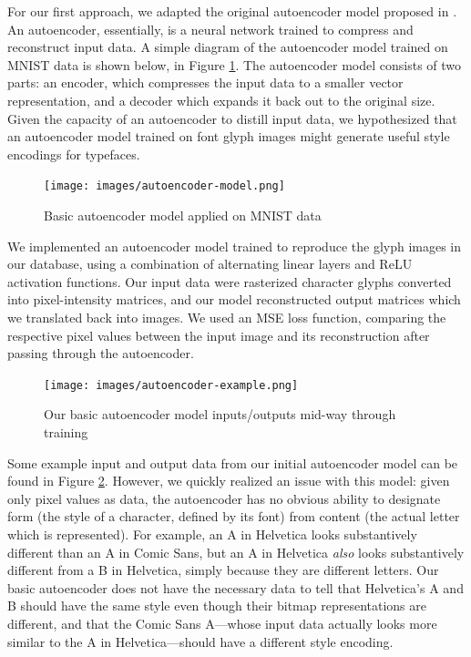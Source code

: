 For our first approach, we adapted the original autoencoder model proposed in \cite{rumelhart1986}. An autoencoder, essentially, is a neural network trained to compress and reconstruct input data. A simple diagram of the autoencoder model trained on MNIST data is shown below, in Figure \ref{fig:autoencoder-model}. The autoencoder model consists of two parts: an encoder, which compresses the input data to a smaller vector representation, and a decoder which expands it back out to the original size. Given the capacity of an autoencoder to distill input data, we hypothesized that an autoencoder model trained on font glyph images might generate useful style encodings for typefaces.

\begin{figure}[h]
    \centering
    \texttt{[image: images/autoencoder-model.png]}
    \caption{Basic autoencoder model applied on MNIST data}
    \label{fig:autoencoder-model}
\end{figure}

We implemented an autoencoder model trained to reproduce the glyph images in our database, using a combination of alternating linear layers and ReLU activation functions. Our input data were rasterized character glyphs converted into pixel-intensity matrices, and our model reconstructed output matrices which we translated back into images. We used an MSE loss function, comparing the respective pixel values between the input image and its reconstruction after passing through the autoencoder.

\begin{figure}[h]
    \centering
    \texttt{[image: images/autoencoder-example.png]}
    \caption{Our basic autoencoder model inputs/outputs mid-way through training}
    \label{fig:autoencoder-example}
\end{figure}

Some example input and output data from our initial autoencoder model can be found in Figure \ref{fig:autoencoder-example}. However, we quickly realized an issue with this model: given only pixel values as data, the autoencoder has no obvious ability to designate form (the style of a character, defined by its font) from content (the actual letter which is represented). For example, an { A} in Helvetica looks substantively different than an { A} in Comic Sans, but an { A} in Helvetica \textit{also} looks substantively different from a { B} in Helvetica, simply because they are different letters. Our basic autoencoder does not have the necessary data to tell that Helvetica's { A} and { B} should have the same style even though their bitmap representations are different, and that the Comic Sans { A}—whose input data actually looks more similar to the { A} in Helvetica—should have a different style encoding.

